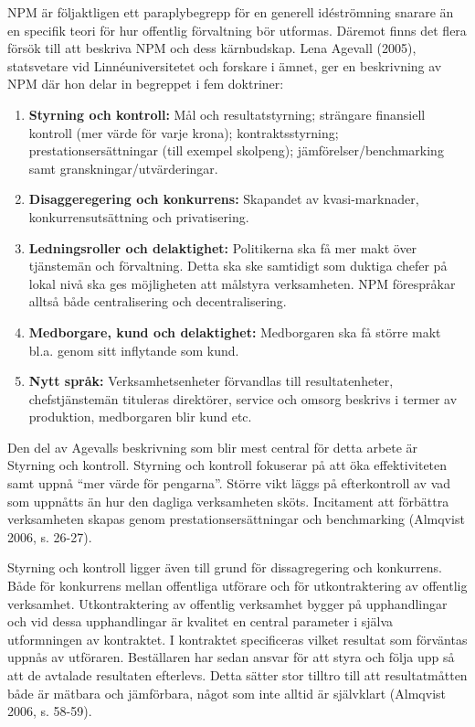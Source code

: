 NPM är följaktligen ett paraplybegrepp för en generell idéströmning snarare än
en specifik teori för hur offentlig förvaltning bör utformas. Däremot finns det
flera försök till att beskriva NPM och dess kärnbudskap. Lena Agevall (2005),
statsvetare vid Linnéuniversitetet och forskare i ämnet, ger en beskrivning av
NPM där hon delar in begreppet i fem doktriner:

\begin{enumerate}
  \item \textbf{Styrning och kontroll:} Mål och resultatstyrning; strängare
  finansiell kontroll (mer värde för varje krona); kontraktsstyrning;
  prestationsersättningar (till exempel skolpeng); jämförelser/benchmarking samt
  granskningar/utvärderingar.
  \item \textbf{Disaggeregering och konkurrens:} Skapandet av kvasi-marknader, konkurrensutsättning och privatisering.
  \item \textbf{Ledningsroller och delaktighet:} Politikerna ska få mer makt över tjänstemän och förvaltning. Detta ska ske samtidigt som duktiga chefer på lokal nivå ska ges möjligheten att målstyra verksamheten. NPM förespråkar alltså både centralisering och decentralisering.
  \item \textbf{Medborgare, kund och delaktighet:} Medborgaren ska få större makt bl.a. genom sitt inflytande som kund.
  \item \textbf{Nytt språk:} Verksamhetsenheter förvandlas till resultatenheter, chefstjänstemän tituleras direktörer, service och omsorg beskrivs i termer av produktion, medborgaren blir kund etc.
\end{enumerate}

Den del av Agevalls beskrivning som blir mest central för detta arbete är Styrning och kontroll. Styrning och kontroll fokuserar på att öka effektiviteten samt uppnå “mer värde för pengarna”. Större vikt läggs på efterkontroll av vad som uppnåtts än hur den dagliga verksamheten sköts. Incitament att förbättra verksamheten skapas genom prestationsersättningar och benchmarking (Almqvist 2006, s. 26-27).
 
Styrning och kontroll ligger även till grund för dissagregering och konkurrens. Både för konkurrens mellan offentliga utförare och för utkontraktering av offentlig verksamhet. Utkontraktering av offentlig verksamhet bygger på upphandlingar och vid dessa upphandlingar är kvalitet en central parameter i själva utformningen av kontraktet. I kontraktet specificeras vilket resultat som förväntas uppnås av utföraren. Beställaren har sedan ansvar för att styra och följa upp så att de avtalade resultaten efterlevs. Detta sätter stor tilltro till att resultatmåtten både är mätbara och jämförbara, något som inte alltid är självklart (Almqvist 2006, s. 58-59).
 
